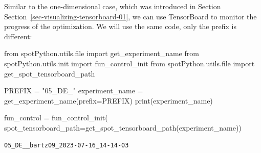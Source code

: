\documentclass[
  letterpaper,
  DIV=11,
  numbers=noendperiod]{scrreprt}
\newenvironment{Shaded}{\begin{snugshade}}{\end{snugshade}}
\newcommand{\BuiltInTok}[1]{\textcolor[rgb]{0.00,0.23,0.31}{#1}}
\newcommand{\ImportTok}[1]{\textcolor[rgb]{0.00,0.46,0.62}{#1}}
\newcommand{\NormalTok}[1]{\textcolor[rgb]{0.00,0.23,0.31}{#1}}
\newcommand{\OperatorTok}[1]{\textcolor[rgb]{0.37,0.37,0.37}{#1}}
\newcommand{\StringTok}[1]{\textcolor[rgb]{0.13,0.47,0.30}{#1}}
\begin{document}
\begin{tcolorbox}[enhanced jigsaw, titlerule=0mm, colbacktitle=quarto-callout-note-color!10!white, coltitle=black, arc=.35mm, toptitle=1mm, colback=white, left=2mm, opacityback=0, bottomtitle=1mm, bottomrule=.15mm, breakable, opacitybacktitle=0.6, colframe=quarto-callout-note-color-frame, rightrule=.15mm, toprule=.15mm, leftrule=.75mm, title=\textcolor{quarto-callout-note-color}{\faInfo}\hspace{0.5em}{TensorBoard}]

Similar to the one-dimensional case, which was introduced in Section
Section~\ref{sec-visualizing-tensorboard-01}, we can use TensorBoard to
monitor the progress of the optimization. We will use the same code,
only the prefix is different:

\begin{Shaded}
\begin{Highlighting}[]
\ImportTok{from}\NormalTok{ spotPython.utils.}\BuiltInTok{file} \ImportTok{import}\NormalTok{ get\_experiment\_name}
\ImportTok{from}\NormalTok{ spotPython.utils.init }\ImportTok{import}\NormalTok{ fun\_control\_init}
\ImportTok{from}\NormalTok{ spotPython.utils.}\BuiltInTok{file} \ImportTok{import}\NormalTok{ get\_spot\_tensorboard\_path}

\NormalTok{PREFIX }\OperatorTok{=} \StringTok{"05\_DE\_"}
\NormalTok{experiment\_name }\OperatorTok{=}\NormalTok{ get\_experiment\_name(prefix}\OperatorTok{=}\NormalTok{PREFIX)}
\BuiltInTok{print}\NormalTok{(experiment\_name)}

\NormalTok{fun\_control }\OperatorTok{=}\NormalTok{ fun\_control\_init(}
\NormalTok{    spot\_tensorboard\_path}\OperatorTok{=}\NormalTok{get\_spot\_tensorboard\_path(experiment\_name))}
\end{Highlighting}
\end{Shaded}

\begin{verbatim}
05_DE__bartz09_2023-07-16_14-14-03
\end{verbatim}

\end{tcolorbox}
\end{document}
